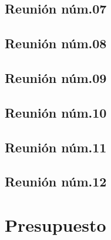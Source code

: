 \documentclass[10pt,spanish]{article}
\let\stdsection\section
\renewcommand\section{\newpage\stdsection}
\begin{document}
\subsection{Reunión núm.07}
\label{anex:actaReunion7}


\subsection{Reunión núm.08}
\label{anex:actaReunion8}


\subsection{Reunión núm.09}
\label{anex:actaReunion9}


\subsection{Reunión núm.10}
\label{anex:actaReunion10}


\subsection{Reunión núm.11}
\label{anex:actaReunion11}
%

\subsection{Reunión núm.12}
\label{anex:actaReunion12}



\section{Presupuesto}
%


%
\end{document}
